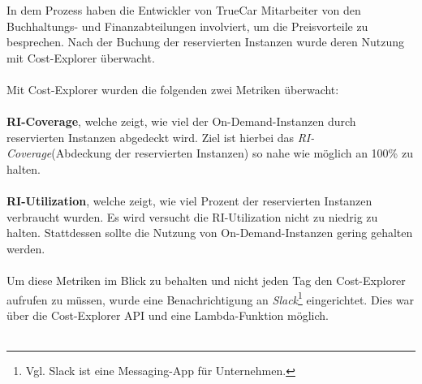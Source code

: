 In dem Prozess haben die Entwickler von TrueCar Mitarbeiter von den Buchhaltungs- und Finanzabteilungen involviert, um die Preisvorteile zu besprechen. Nach der Buchung der reservierten Instanzen wurde deren Nutzung mit Cost-Explorer überwacht. 
\\\\
Mit Cost-Explorer wurden die folgenden zwei Metriken überwacht: 
\\\\
\textbf{RI-Coverage}, welche zeigt, wie viel der On-Demand-Instanzen durch reservierten Instanzen abgedeckt wird. Ziel ist hierbei das \textit{RI-Coverage}(Abdeckung der reservierten Instanzen) so nahe wie möglich an 100\% zu halten.
\\\\
\textbf{RI-Utilization}, welche zeigt, wie viel Prozent der reservierten Instanzen verbraucht wurden. Es wird versucht die RI-Utilization nicht zu niedrig zu halten. Stattdessen sollte die Nutzung von On-Demand-Instanzen gering gehalten werden. 
\\\\
Um diese Metriken im Blick zu behalten und nicht jeden Tag den Cost-Explorer aufrufen zu müssen, wurde eine Benachrichtigung an \textit{Slack}\footnote{Vgl. Slack ist eine Messaging-App für Unternehmen\cite{SLACK}.} eingerichtet. Dies war über die Cost-Explorer API und eine Lambda-Funktion möglich.
\\\\

